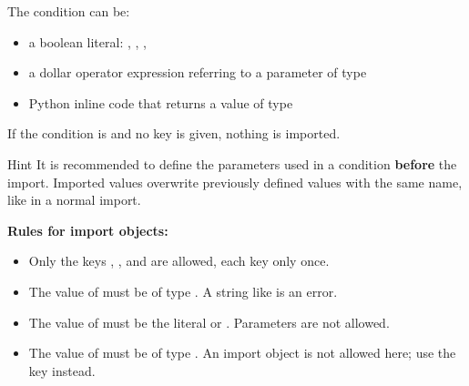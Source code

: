 
The condition can be:

\begin{itemize}
   \item a boolean literal: , , , 
   \item a dollar operator expression referring to a parameter of type 
   \item Python inline code that returns a value of type 
\end{itemize}

If the condition is  and no  key is given, nothing is imported.

\vspace{2ex}

\begin{boxhint}{Hint}
It is recommended to define the parameters used in a condition \textbf{before} the import. Imported values overwrite previously
defined values with the same name, like in a normal import.
\end{boxhint}

\vspace{2ex}

\textbf{Rules for import objects:}

\begin{itemize}
   \item Only the keys , ,  and  are allowed, each key only once.
   \item The value of  must be of type . A string like  is an error.
   \item The value of  must be the literal  or . Parameters are not allowed.
   \item The value of  must be of type . An import object is not allowed here;
         use the key  instead.
\end{itemize}

